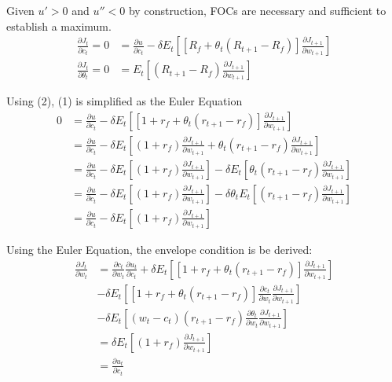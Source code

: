 \documentclass[]{article}
\begin{document}
Given $u'>0$ and $u''<0$ by construction, FOCs are necessary and sufficient to establish a maximum.
\begin{align}
	\frac{\partial J_t}{\partial c_t} = 0 &= \frac{\partial u}{\partial c_t} - \delta E_t \left[[R_f + \theta_t (R_{t+1} - R_f) ]\frac{\partial J_{t+1}}{\partial w_{t+1}}\right]\\
	\frac{\partial J_t}{\partial \theta_t} = 0 &= E_t \left[(R_{t+1}-R_f) \frac{\partial J_{t+1}}{\partial w_{t+1}} \right]
\end{align}

Using (2), (1) is simplified as the Euler Equation
\begin{align*}
	0 &= \frac{\partial u}{\partial c_t} - \delta E_t \left[\left[1 + r_f + \theta_t(r_{t+1}-r_f) \right]\frac{\partial J_{t+1}}{\partial w_{t+1}}\right]\\
	&= \frac{\partial u}{\partial c_t} - \delta E_t \left[(1 + r_f) \frac{\partial J_{t+1}}{\partial w_{t+1}} + \theta_t(r_{t+1}-r_f) \frac{\partial J_{t+1}}{\partial w_{t+1}}\right] \\
	&= \frac{\partial u}{\partial c_t} - \delta E_t \left[(1 + r_f)\frac{\partial J_{t+1}}{\partial w_{t+1}} \right] - \delta E_t \left[ \theta_t(r_{t+1}-r_f) \frac{\partial J_{t+1}}{\partial w_{t+1}}\right] \\
	&= \frac{\partial u}{\partial c_t} - \delta E_t \left[(1 + r_f)\frac{\partial J_{t+1}}{\partial w_{t+1}} \right] - \delta \theta_t E_t \left[(r_{t+1}-r_f) \frac{\partial J_{t+1}}{\partial w_{t+1}}\right] \\
	&= \frac{\partial u}{\partial c_t} - \delta E_t \left[(1 + r_f)\frac{\partial J_{t+1}}{\partial w_{t+1}} \right]
\end{align*}

Using the Euler Equation, the envelope condition is be derived:
\begin{align*}
	\frac{\partial J_t}{\partial w_t} &= \frac{\partial c_t}{\partial w_t} \frac{\partial u_t}{\partial c_t} + \delta E_t \left[\left[1 + r_f + \theta_t(r_{t+1}-r_f) \right]\frac{\partial J_{t+1}}{\partial w_{t+1}}\right]\\
	&- \delta E_t \left[\left[1 + r_f + \theta_t(r_{t+1}-r_f) \right]\frac{\partial c_t}{\partial w_t}\frac{\partial J_{t+1}}{\partial w_{t+1}}\right]\\
	&- \delta E_t\left[(w_t - c_t)(r_{t+1}-r_f)\frac{\partial \theta_t}{\partial w_t}\frac{\partial J_{t+1}}{\partial w_{t+1}}\right]\\
	&= \delta E_t \left[(1 + r_f)\frac{\partial J_{t+1}}{\partial w_{t+1}} \right]\\
	&= \frac{\partial u_t}{\partial c_t}
\end{align*}
\end{document}
